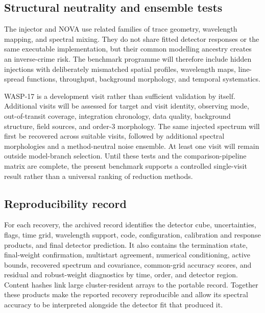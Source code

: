 \subsection{Structural neutrality and ensemble tests}

The injector and NOVA use related families of trace geometry, wavelength
mapping, and spectral mixing. They do not share fitted detector responses or
the same executable implementation, but their common modelling ancestry
creates an inverse-crime risk. The benchmark programme will therefore include
hidden injections with deliberately mismatched spatial profiles, wavelength
maps, line-spread functions, throughput, background morphology, and temporal
systematics.

WASP-17 is a development visit rather than sufficient validation by itself.
Additional visits will be assessed for target and visit identity, observing
mode, out-of-transit coverage, integration chronology, data quality,
background structure, field sources, and order-3 morphology. The same injected
spectrum will first be recovered across suitable visits, followed by
additional spectral morphologies and a method-neutral noise ensemble. At least
one visit will remain outside model-branch selection. Until these tests and
the comparison-pipeline matrix are complete, the present benchmark supports a
controlled single-visit result rather than a universal ranking of reduction
methods.

\subsection{Reproducibility record}

For each recovery, the archived record identifies the detector cube,
uncertainties, flags, time grid, wavelength support, code, configuration,
calibration and response products, and final detector prediction. It also
contains the termination state, final-weight confirmation, multistart
agreement, numerical conditioning, active bounds, recovered spectrum and
covariance, common-grid accuracy scores, and residual and robust-weight
diagnostics by time, order, and detector region. Content hashes link large
cluster-resident arrays to the portable record. Together these products make
the reported recovery reproducible and allow its spectral accuracy to be
interpreted alongside the detector fit that produced it.
